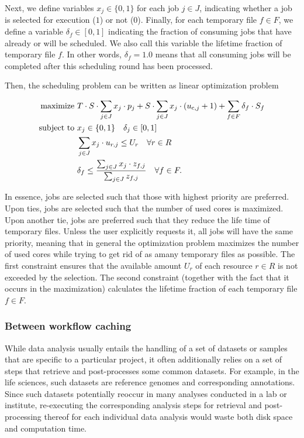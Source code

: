 \documentclass[parskip=half]{scrartcl}
\begin{document}
Next, we define variables $x_j \in \{0,1\}$ for each job $j \in J$, indicating whether a job is selected for execution ($1$) or not ($0$).
Finally, for each temporary file $f \in F$, we define a variable $\delta_f \in [0,1]$ indicating the fraction of consuming jobs that have already or will be scheduled.
We also call this variable the lifetime fraction of temporary file $f$.
In other words, $\delta_f = 1.0$ means that all consuming jobs will be completed after this scheduling round has been processed.

Then, the scheduling problem can be written as linear optimization problem 

\begin{align*}
	\text{maximize } & T \cdot S \cdot \sum_{j \in J} x_j \cdot p_j + S \cdot \sum_{j \in J} x_j \cdot (u_{\text{c},j} + 1) + \sum_{f \in F} \delta_f \cdot S_f \\ \text{subject to } & x_j \in \{0,1\} \quad \delta_j \in [0,1]\\ \quad & \sum_{j \in J} x_j \cdot u_{r,j} \leq U_r \quad \forall r \in R\\ \quad & \delta_f \leq \frac{\sum_{j \in J} x_j \cdot z_{f,j}}{\sum_{j \in J} z_{f,j}} \quad\forall f \in F.
\end{align*}

In essence, jobs are selected such that those with highest priority are preferred.
Upon ties, jobs are selected such that the number of used cores is maximized.
Upon another tie, jobs are preferred such that they reduce the life time of temporary files.
Unless the user explicitly requests it, all jobs will have the same priority, meaning that in general the optimization problem maximizes the number of used cores while trying to get rid of as amany temporary files as possible.
The first constraint ensures that the available amount $U_r$ of each resource $r \in R$ is not exceeded by the selection.
The second constraint (together with the fact that it occurs in the maximization) calculates the lifetime fraction of each temporary file $f \in F$.

\subsubsection{Between workflow caching}

While data analysis usually entails the handling of a set of datasets or samples that are specific to a particular project, it often additionally relies on a set of steps that retrieve and post-processes some common datasets.
For example, in the life sciences, such datasets are reference genomes and corresponding annotations.
Since such datasets potentially reoccur in many analyses conducted in a lab or institute, re-executing the corresponding analysis steps for retrieval and post-processing thereof for each individual data analysis would waste both disk space and computation time.
\end{document}
